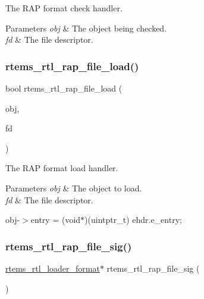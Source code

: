 The R\+AP format check handler.


\begin{DoxyParams}{Parameters}
{\em obj} & The object being checked. \\
\hline
{\em fd} & The file descriptor. \\
\hline
\end{DoxyParams}
\mbox{\label{rtl-rap_8c_a0ce5487461c31a98e4ddda966ad7fad9}} 
\subsubsection{\texorpdfstring{rtems\_rtl\_rap\_file\_load()}{rtems\_rtl\_rap\_file\_load()}}
{\footnotesize\ttfamily bool rtems\+\_\+rtl\+\_\+rap\+\_\+file\+\_\+load (\begin{DoxyParamCaption}\item[{\mbox{\hyperlink{structrtems__rtl__obj}{rtems\+\_\+rtl\+\_\+obj}} $\ast$}]{obj,  }\item[{int}]{fd }\end{DoxyParamCaption})}

The R\+AP format load handler.


\begin{DoxyParams}{Parameters}
{\em obj} & The object to load. \\
\hline
{\em fd} & The file descriptor. \\
\hline
\end{DoxyParams}
obj-\/$>$entry = (void$\ast$)(uintptr\+\_\+t) ehdr.\+e\+\_\+entry; \mbox{\label{rtl-rap_8c_a0ba92ca2206cf08da6e0ead2563ae1fd}} 
\subsubsection{\texorpdfstring{rtems\_rtl\_rap\_file\_sig()}{rtems\_rtl\_rap\_file\_sig()}}
{\footnotesize\ttfamily \mbox{\hyperlink{structrtems__rtl__loader__format}{rtems\+\_\+rtl\+\_\+loader\+\_\+format}}$\ast$ rtems\+\_\+rtl\+\_\+rap\+\_\+file\+\_\+sig (\begin{DoxyParamCaption}\item[{void}]{ }\end{DoxyParamCaption})}

